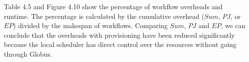 Table 4.5 and Figure 4.10 show the percentage of workflow overheads and runtime. The percentage is calculated by the cumulative overhead ($Sum$, $PJ$, or $EP$) divided by the makespan of workflows. Comparing $Sum$, $PJ$ and $EP$, we can conclude that the overheads with provisioning have been reduced significantly because the local scheduler has direct control over the resources without going through Globus. 
